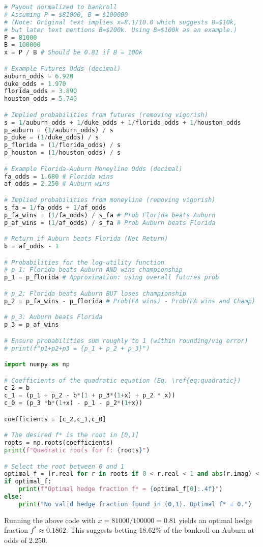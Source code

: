 \documentclass{article}
\begin{document}
\begin{lstlisting}[language=Python, caption={Python code for calculating inputs and solving the quadratic for the game-by-game hedge fraction.}]
# Payout normalized to bankroll
# Assuming P = $81000, B = $100000 
# (Note: Original text implies x=8.1/10.0 which suggests B=$10k, 
# but later text mentions B=$200k. Using B=$100k as an example.)
P = 81000
B = 100000 
x = P / B # Should be 0.81 if B = 100k

# Example Futures Odds (decimal)
auburn_odds = 6.920
duke_odds = 1.970
florida_odds = 3.890
houston_odds = 5.740

# Implied probabilities from futures (removing vigorish)
s = 1/auburn_odds + 1/duke_odds + 1/florida_odds + 1/houston_odds
p_auburn = (1/auburn_odds) / s
p_duke = (1/duke_odds) / s
p_florida = (1/florida_odds) / s
p_houston = (1/houston_odds) / s

# Example Florida-Auburn Moneyline Odds (decimal)
fa_odds = 1.680 # Florida wins
af_odds = 2.250 # Auburn wins

# Implied probabilities from moneyline (removing vigorish)
s_fa = 1/fa_odds + 1/af_odds
p_fa_wins = (1/fa_odds) / s_fa # Prob Florida beats Auburn
p_af_wins = (1/af_odds) / s_fa # Prob Auburn beats Florida

# Return if Auburn beats Florida (Net Return)
b = af_odds - 1

# Probabilities for the log-utility function
# p_1: Florida beats Auburn AND wins championship
p_1 = p_florida # Approximation: using overall futures prob

# p_2: Florida beats Auburn BUT loses championship
p_2 = p_fa_wins - p_florida # Prob(FA wins) - Prob(FA wins and Champ)

# p_3: Auburn beats Florida
p_3 = p_af_wins 

# Ensure probabilities sum roughly to 1 (within rounding/vig error)
# print(f"p1+p2+p3 = {p_1 + p_2 + p_3}") 

import numpy as np

# Coefficients of the quadratic equation (Eq. \ref{eq:quadratic})
c_2 = b
c_1 = (p_1 + p_2 - b*(1 + p_3*(1+x) + p_2 * x))
c_0 = (p_3 *b*(1+x) - p_1 - p_2*(1+x))

coefficients = [c_2,c_1,c_0]

# The desired f* is the root in [0,1]
roots = np.roots(coefficients)
print(f"Quadratic roots for f: {roots}")

# Select the root between 0 and 1
optimal_f = [r.real for r in roots if 0 < r.real < 1 and abs(r.imag) < 1e-9]
if optimal_f:
    print(f"Optimal hedge fraction f* = {optimal_f[0]:.4f}")
else:
    print("No valid hedge fraction found in (0,1). Optimal f* = 0.")
\end{lstlisting}
Running the above code with $x = 81000 / 100000 = 0.81$ yields an optimal hedge fraction $f^* \approx 0.1862$. This suggests betting 18.62\% of the bankroll on Auburn at odds of 2.250.
\end{document}
